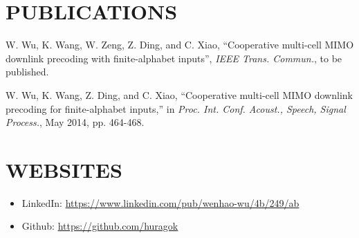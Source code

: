 \documentclass[margin]{res} %
\begin{document}
\begin{resume}
        \section{PUBLICATIONS}
        \begin{enumerate}[label={[\arabic*]}]
            \item W. Wu, K. Wang, W. Zeng, Z. Ding, and C. Xiao, ``Cooperative
            multi-cell MIMO downlink precoding with finite-alphabet inputs'',
            \emph{IEEE Trans. Commun.}, to be published.
            \item W. Wu, K. Wang, Z. Ding, and C. Xiao, ``Cooperative multi-cell
            MIMO downlink precoding for finite-alphabet inputs,'' in \emph{Proc.
            Int.
            Conf. Acoust., Speech, Signal Process.}, May 2014, pp. 464-468.
        \end{enumerate}
    
    
        \section{WEBSITES} 
        \begin{itemize}
            \item LinkedIn: \url{https://www.linkedin.com/pub/wenhao-wu/4b/249/ab}
            \item Github: \url{https://github.com/huragok}
        \end{itemize}
        
        \pagebreak 

\end{resume}
\end{document}

